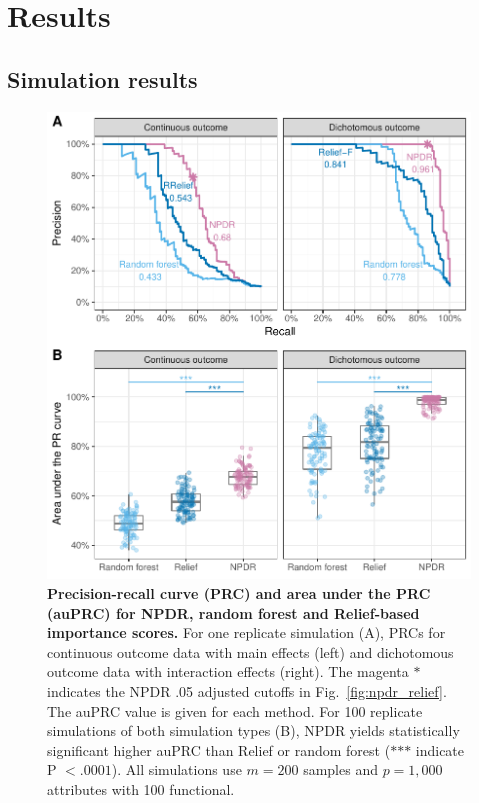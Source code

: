 \documentclass[10pt]{article}
\begin{document}

\section{Results}
\subsection{Simulation results} 

\begin{figure}[!tbp]
\centerline{\includegraphics[trim = 0 0 0 0]{../figs/fig2_pr_plots.pdf}}
\caption{{\bf Precision-recall curve (PRC) and area under the PRC (auPRC) for NPDR, random forest and Relief-based importance scores.} For one replicate simulation (A), PRCs for continuous outcome data with main effects (left) and dichotomous outcome data with interaction effects (right). The magenta $\ast$ indicates the NPDR .05 adjusted cutoffs in Fig.~\ref{fig:npdr_relief}. The auPRC value is given for each method. For 100 replicate simulations of both simulation types (B), NPDR yields statistically significant higher auPRC than Relief or random forest ($\ast$$\ast$$\ast$ indicate P $<.0001$). All simulations use $m = 200$ samples and $p = 1,000$ attributes with 100 functional. }
\label{fig:pr_curve}
\end{figure}
\end{document}
